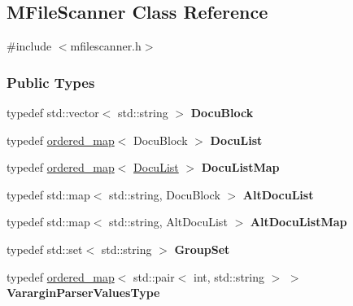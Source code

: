 \hypertarget{class_m_file_scanner}{}\subsection{M\+File\+Scanner Class Reference}
\label{class_m_file_scanner}


{\ttfamily \#include $<$mfilescanner.\+h$>$}

\subsubsection*{Public Types}
\begin{DoxyCompactItemize}
\item 
\hypertarget{class_m_file_scanner_aff53805cd2d976dc6883321337de350b}{}typedef std\+::vector$<$ std\+::string $>$ {\bfseries Docu\+Block}\label{class_m_file_scanner_aff53805cd2d976dc6883321337de350b}

\item 
\hypertarget{class_m_file_scanner_a06ec1ddcf48249dc7335c2d85b1c13ae}{}typedef \hyperlink{classordered__map}{ordered\+\_\+map}$<$ Docu\+Block $>$ {\bfseries Docu\+List}\label{class_m_file_scanner_a06ec1ddcf48249dc7335c2d85b1c13ae}

\item 
\hypertarget{class_m_file_scanner_a0329ebf827fb087f172d7e77d1c152e5}{}typedef \hyperlink{classordered__map}{ordered\+\_\+map}$<$ \hyperlink{classordered__map}{Docu\+List} $>$ {\bfseries Docu\+List\+Map}\label{class_m_file_scanner_a0329ebf827fb087f172d7e77d1c152e5}

\item 
\hypertarget{class_m_file_scanner_a09f82fa2970e4859f4ba43f729e23ac5}{}typedef std\+::map$<$ std\+::string, Docu\+Block $>$ {\bfseries Alt\+Docu\+List}\label{class_m_file_scanner_a09f82fa2970e4859f4ba43f729e23ac5}

\item 
\hypertarget{class_m_file_scanner_a8dbb3b103e795c6d7dc312319a036321}{}typedef std\+::map$<$ std\+::string, Alt\+Docu\+List $>$ {\bfseries Alt\+Docu\+List\+Map}\label{class_m_file_scanner_a8dbb3b103e795c6d7dc312319a036321}

\item 
\hypertarget{class_m_file_scanner_ac5139d08364982d139c47e214bb29b99}{}typedef std\+::set$<$ std\+::string $>$ {\bfseries Group\+Set}\label{class_m_file_scanner_ac5139d08364982d139c47e214bb29b99}

\item 
\hypertarget{class_m_file_scanner_a61767914e49a480691025d0f36f808ed}{}typedef \hyperlink{classordered__map}{ordered\+\_\+map}$<$ std\+::pair$<$ int, std\+::string $>$ $>$ {\bfseries Varargin\+Parser\+Values\+Type}\label{class_m_file_scanner_a61767914e49a480691025d0f36f808ed}

\end{DoxyCompactItemize}
